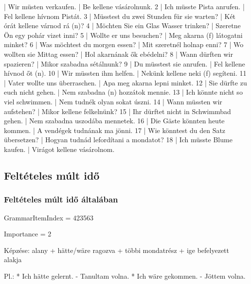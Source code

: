 \documentclass{article}
\newenvironment{desc}{\verbatim}{\endverbatim}
\newenvironment{exmp}{\verbatim}{\endverbatim}
\begin{document}
\begin{exmp}
1 | Wir müsten verkaufen. | Be kellene vásárolnunk.
2 | Ich müsste Pista anrufen. | Fel kellene hívnom Pistát.
3 | Müsstest du zwei Stunden für sie warten? | Két órát kellene várnod rá (n)?
4 | Möchten Sie ein Glas Wasser trinken? | Szeretne Ön egy pohár vizet inni?
5 | Wollte er uns besuchen? | Meg akarna (f) látogatni minket?
6 | Was möchtest du morgen essen? | Mit szeretnél holnap enni?
7 | Wo wollten sie Mittag essen? | Hol akarnának ők ebédelni?
8 | Wann dürften wir spazieren? | Mikor szabadna sétálnunk?
9 | Du müsstest sie anrufen. | Fel kellene hívnod őt (n).
10 | Wir müssten ihm helfen. | Nekünk kellene neki (f) segíteni.
11 | Vater wollte uns überraschen. | Apa meg akarna lepni minket.
12 | Sie dürfte zu euch nicht gehen. | Nem szabadna (n) hozzátok mennie.
13 | Ich könnte nicht so viel schwimmen. | Nem tudnék olyan sokat úszni.
14 | Wann müssten wir aufstehen? | Mikor kellene felkelnünk?
15 | Ihr dürftet nicht in Schwimmbad gehen. | Nem szabadna uszodába mennetek.
16 | Die Gäste könnten heute kommen. | A vendégek tudnának ma jönni.
17 | Wie könntest du den Satz übersetzen? | Hogyan tudnád lefordítani a mondatot?
18 | Ich müsste Blume kaufen. | Virágot kellene vásárolnom.
\end{exmp}

\subsection{Feltételes múlt idő}

\subsubsection{Feltételes múlt idő általában}

GrammarItemIndex = 423563

Importance = 2

\begin{desc}
Képzése:
alany + hätte/wäre ragozva + többi mondatrész + ige befelyezett alakja

Pl.: * Ich hätte gelernt. - Tanultam volna.
* Ich wäre gekommen. - Jöttem volna.
\end{desc}
\end{document}
